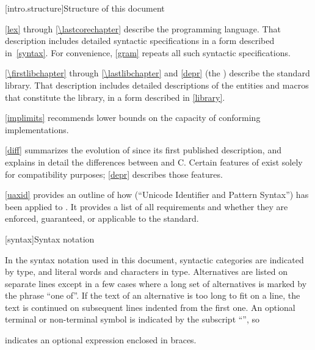 [intro.structure]{Structure of this document}

\pnum
{}%
%
\ref{lex} through \ref{\lastcorechapter} describe the \Cpp{} programming
language. That description includes detailed syntactic specifications in
a form described in~\ref{syntax}. For convenience, \ref{gram}
repeats all such syntactic specifications.

\pnum
\ref{\firstlibchapter} through \ref{\lastlibchapter} and \ref{depr}
(the ) describe the \Cpp{} standard library.
That description includes detailed descriptions of the
entities and macros
that constitute the library, in a form described in \ref{library}.

\pnum
\ref{implimits} recommends lower bounds on the capacity of conforming
implementations.

\pnum
\ref{diff} summarizes the evolution of \Cpp{} since its first
published description, and explains in detail the differences between
\Cpp{} and C\@. Certain features of \Cpp{} exist solely for compatibility
purposes; \ref{depr} describes those features.

\pnum
\ref{uaxid} provides an outline of how 
(``Unicode Identifier and Pattern Syntax'') has been applied to \Cpp{}.
It provides a list of all requirements and whether they are enforced,
guaranteed, or applicable to the standard.

[syntax]{Syntax notation}

\pnum
{}%
In the syntax notation used in this document, syntactic
categories are indicated by  type, and literal words
and characters in   type. Alternatives are
listed on separate lines except in a few cases where a long set of
alternatives is marked by the phrase ``one of''. If the text of an alternative is too long to fit on a line, the text is continued on subsequent lines indented from the first one.
An optional terminal or non-terminal symbol is indicated by the subscript
``\opt{\relax}'', so
\begin{ncbnf}
\terminal{\{}  \terminal{\}}
\end{ncbnf}
indicates an optional expression enclosed in braces.%

